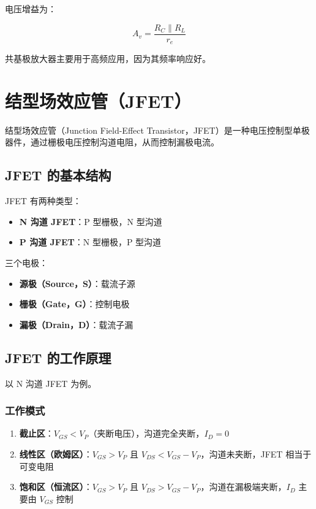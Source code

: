 电压增益为：

\begin{equation}
A_v = \frac{R_C \parallel R_L}{r_e} \label{eq:cb-voltage-gain}
\end{equation}

共基极放大器主要用于高频应用，因为其频率响应好。

\section{结型场效应管（JFET）}

结型场效应管（Junction Field-Effect Transistor，JFET）是一种电压控制型单极器件，通过栅极电压控制沟道电阻，从而控制漏极电流。

\subsection{JFET 的基本结构}

JFET 有两种类型：
\begin{itemize}
  \item \textbf{N 沟道 JFET}：P 型栅极，N 型沟道
  \item \textbf{P 沟道 JFET}：N 型栅极，P 型沟道
\end{itemize}

三个电极：
\begin{itemize}
  \item \textbf{源极（Source，S）}：载流子源
  \item \textbf{栅极（Gate，G）}：控制电极
  \item \textbf{漏极（Drain，D）}：载流子漏
\end{itemize}

\subsection{JFET 的工作原理}

以 N 沟道 JFET 为例。

\subsubsection{工作模式}

\begin{enumerate}
  \item \textbf{截止区}：$V_{GS} < V_P$（夹断电压），沟道完全夹断，$I_D = 0$
  \item \textbf{线性区（欧姆区）}：$V_{GS} > V_P$ 且 $V_{DS} < V_{GS} - V_P$，沟道未夹断，JFET 相当于可变电阻
  \item \textbf{饱和区（恒流区）}：$V_{GS} > V_P$ 且 $V_{DS} > V_{GS} - V_P$，沟道在漏极端夹断，$I_D$ 主要由 $V_{GS}$ 控制
\end{enumerate}

